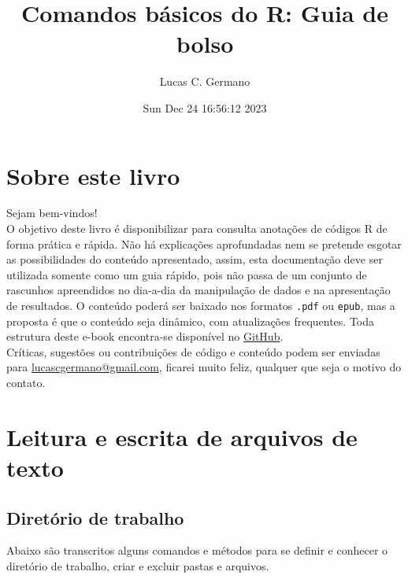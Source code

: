 \documentclass[
]{book}
\title{Comandos básicos do R: Guia de bolso}
\author{Lucas C. Germano}
\date{Sun Dec 24 16:56:12 2023}
\theoremstyle{definition}
\theoremstyle{definition}
\theoremstyle{definition}
\theoremstyle{definition}
\theoremstyle{remark}
\begin{document}
\maketitle

{
\setcounter{tocdepth}{1}
\tableofcontents
}
\hypertarget{sobre-este-livro}{%
\chapter*{Sobre este livro}\label{sobre-este-livro}}

Sejam bem-vindos!\\
O objetivo deste livro é disponibilizar para consulta anotações de códigos R de forma prática e rápida. Não há explicações aprofundadas nem se pretende esgotar as possibilidades do conteúdo apresentado, assim, esta documentação deve ser utilizada somente como um guia rápido, pois não passa de um conjunto de rascunhos apreendidos no dia-a-dia da manipulação de dados e na apresentação de resultados. O conteúdo poderá ser baixado nos formatos \texttt{.pdf} ou \texttt{epub}, mas a proposta é que o conteúdo seja dinâmico, com atualizações frequentes. Toda estrutura deste e-book encontra-se disponível no \href{https://github.com/lucascgmermano/guia_de_bolso.git}{GitHub}.\\
Críticas, sugestões ou contribuições de código e conteúdo podem ser enviadas para \url{lucascgermano@gmail.com}, ficarei muito feliz, qualquer que seja o motivo do contato.

\hypertarget{leitura-e-escrita-de-arquivos-de-texto}{%
\chapter{Leitura e escrita de arquivos de texto}\label{leitura-e-escrita-de-arquivos-de-texto}}

\hypertarget{diretuxf3rio-de-trabalho}{%
\section{Diretório de trabalho}\label{diretuxf3rio-de-trabalho}}

Abaixo são transcritos alguns comandos e métodos para se definir e conhecer o diretório de trabalho, criar e excluir pastas e arquivos.
\end{document}
